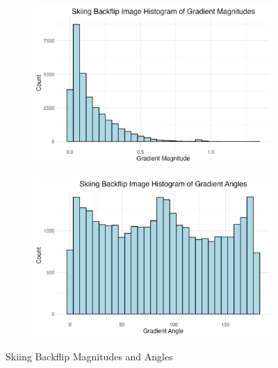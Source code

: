 \documentclass[
  letterpaper,
  DIV=11,
  numbers=noendperiod]{scrreprt}
\begin{document}
\begin{figure}

\begin{minipage}{0.50\linewidth}

\begin{figure}[H]

{\centering \includegraphics{images/plots/backflip/backflip_histogram_mag_plot.jpg}

}


\end{figure}%

\end{minipage}%
%
\begin{minipage}{0.50\linewidth}

\begin{figure}[H]

{\centering \includegraphics{images/plots/backflip/backflip_histogram_theta_plot.jpg}

}


\end{figure}%

\end{minipage}%

\caption{\label{fig-flip-histograms}Skiing Backflip Magnitudes and
Angles}

\end{figure}%
\end{document}
